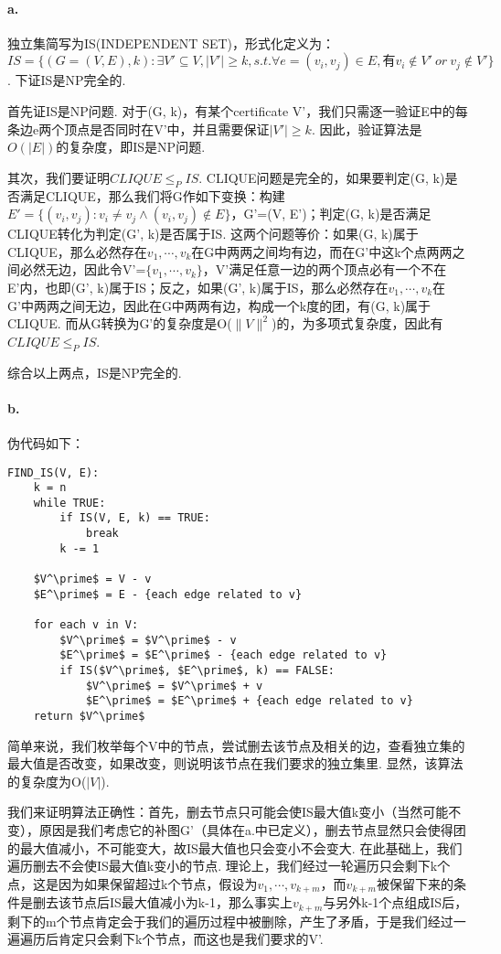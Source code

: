 \documentclass[UTF8]{ctexart}
\begin{document}
\paragraph*{a.}独立集简写为IS(INDEPENDENT SET)，形式化定义为：
$$IS=\{(G=(V,E), k): \exists V'\subseteq V, |V'|\ge k, s.t. \forall e=(v_i, v_j)\in E,\text{有}v_i\notin V'\ or\ v_j \notin V'\}$$.
下证IS是NP完全的.\par
首先证IS是NP问题. 对于(G, k)，有某个certificate V'，我们只需逐一验证E中的每条边e两个顶点是否同时在V'中，并且需要保证$|V'|\ge k$. 因此，验证算法是$O(|E|)$的复杂度，即IS是NP问题.\par
其次，我们要证明$CLIQUE \le_P IS$. CLIQUE问题是完全的，如果要判定(G, k)是否满足CLIQUE，那么我们将G作如下变换：构建$E'=\{(v_i, v_j): v_i\neq v_j \wedge (v_i, v_j)\notin E\}$，G'=(V, E')；判定(G, k)是否满足CLIQUE转化为判定(G', k)是否属于IS. 这两个问题等价：如果(G, k)属于CLIQUE，那么必然存在$v_1,\cdots,v_k$在G中两两之间均有边，而在G'中这k个点两两之间必然无边，因此令V'=$\{v_1,\cdots,v_k\}$，V'满足任意一边的两个顶点必有一个不在E'内，也即(G', k)属于IS；反之，如果(G', k)属于IS，那么必然存在$v_1,\cdots,v_k$在G'中两两之间无边，因此在G中两两有边，构成一个k度的团，有(G, k)属于CLIQUE. 而从G转换为G'的复杂度是O($\|V\|^2$)的，为多项式复杂度，因此有$CLIQUE \le_P IS$.\par
综合以上两点，IS是NP完全的.

\paragraph*{b.} 伪代码如下：
\begin{lstlisting}[mathescape=true]
FIND_IS(V, E):
    k = n
    while TRUE:
        if IS(V, E, k) == TRUE:
            break
        k -= 1
        
    $V^\prime$ = V - v
    $E^\prime$ = E - {each edge related to v}

    for each v in V:
        $V^\prime$ = $V^\prime$ - v
        $E^\prime$ = $E^\prime$ - {each edge related to v}
        if IS($V^\prime$, $E^\prime$, k) == FALSE:
            $V^\prime$ = $V^\prime$ + v
            $E^\prime$ = $E^\prime$ + {each edge related to v}
    return $V^\prime$
\end{lstlisting}\par
简单来说，我们枚举每个V中的节点，尝试删去该节点及相关的边，查看独立集的最大值是否改变，如果改变，则说明该节点在我们要求的独立集里. 显然，该算法的复杂度为O($|V|$).\par
我们来证明算法正确性：首先，删去节点只可能会使IS最大值k变小（当然可能不变），原因是我们考虑它的补图G'（具体在a.中已定义），删去节点显然只会使得团的最大值减小，不可能变大，故IS最大值也只会变小不会变大. 在此基础上，我们遍历删去不会使IS最大值k变小的节点. 理论上，我们经过一轮遍历只会剩下k个点，这是因为如果保留超过k个节点，假设为$v_1,\cdots,v_{k+m}$，而$v_{k+m}$被保留下来的条件是删去该节点后IS最大值减小为k-1，那么事实上$v_{k+m}$与另外k-1个点组成IS后，剩下的m个节点肯定会于我们的遍历过程中被删除，产生了矛盾，于是我们经过一遍遍历后肯定只会剩下k个节点，而这也是我们要求的V'.
\end{document}
